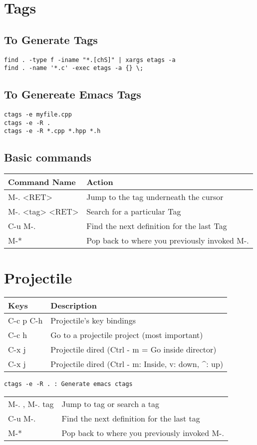 \documentclass[11pt]{article}
\begin{document}
\section{Tags}
\label{sec:orgfc103f4}
\subsection{To Generate Tags}
\label{sec:org093c814}
\begin{verbatim}
find . -type f -iname "*.[chS]" | xargs etags -a
find . -name '*.c' -exec etags -a {} \;
\end{verbatim}
\subsection{To Genereate Emacs Tags}
\label{sec:org4eda625}
\begin{verbatim}
ctags -e myfile.cpp
ctags -e -R .
ctags -e -R *.cpp *.hpp *.h
\end{verbatim}

\subsection{Basic commands}
\label{sec:orgf8e62b9}

\begin{center}
\begin{tabular}{ll}
\hline
Command Name & Action\\
\hline
M-. <RET> & Jump to the tag underneath the cursor\\
M-. <tag> <RET> & Search for a particular Tag\\
C-u M-. & Find the next definition for the last Tag\\
M-* & Pop back to where you previously invoked M-.\\
\hline
\end{tabular}
\end{center}

\section{Projectile}
\label{sec:org2694e14}
\begin{center}
\begin{tabular}{ll}
\hline
Keys & Description\\
\hline
C-c p C-h & Projectile's key bindings\\
C-c h & Go to a projectile project (most important)\\
C-x j & Projectile dired (Ctrl - m = Go inside director)\\
\hline
C-x j & Projectile dired (Ctrl - m: Inside, v: down, \^{}: up)\\
\hline
\end{tabular}
\end{center}

\begin{verbatim}
ctags -e -R . : Generate emacs ctags
\end{verbatim}
\begin{center}
\begin{tabular}{ll}
\hline
M-. , M-. tag & Jump to tag or search a tag\\
C-u M-. & Find the next definition for the last tag\\
M-* & Pop back to where you previously invoked M-.\\
\hline
\end{tabular}
\end{center}
\end{document}

